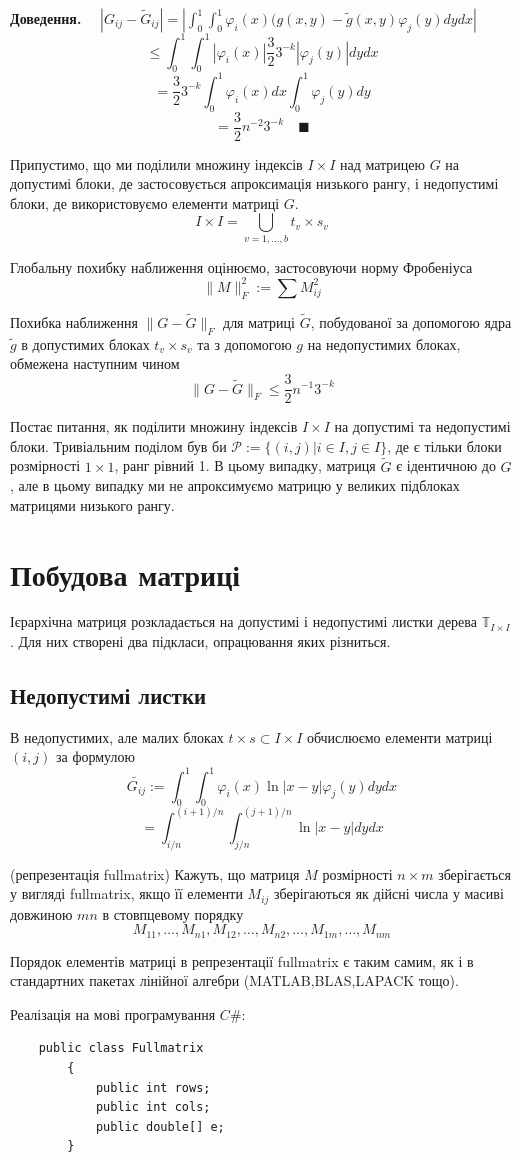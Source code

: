 \documentclass[12pt]{report}
\begin{document}
	{\bf Доведення.} $\quad|G_{ij}-\tilde{G}_{ij}|=|\int_{0}^{1}\int_{0}^{1}\varphi_i(x)(g(x,y)-\tilde{g}(x,y)\varphi_j(y)dydx|$
	$$\le \int_{0}^{1}\int_{0}^{1}|\varphi_i(x)|\frac{3}{2}3^{-k}|\varphi_j(y)|dydx$$
	$$=\frac{3}{2}3^{-k}\int_{0}^{1}\varphi_i(x)dx\int_{0}^{1}\varphi_j(y)dy$$
	$$= \frac{3}{2}n^{-2}3^{-k} \quad\blacksquare$$ 
	\par Припустимо, що ми поділили множину індексів $I\times I$ над матрицею $G$ на допустимі блоки, де застосовується апроксимація низького рангу, і недопустимі блоки, де використовуємо елементи матриці $G$.
	$$I\times I=\bigcup_{v=1,\dots,b}t_v\times s_v$$
	\par Глобальну похибку наближення оцінюємо, застосовуючи норму Фробеніуса 
	$$\|M\|^2_F:=\sum M_{ij}^2$$
	\begin{Lem}
	Похибка наближення $\|G-\tilde{G}\|_F$ для матриці $\tilde{G}$, побудованої за допомогою ядра $\tilde{g}$ в допустимих блоках $t_v\times s_v$ та з допомогою $g$ на недопустимих блоках, обмежена наступним чином
	$$\|G-\tilde{G}\|_F\le \frac{3}{2}n^{-1}3^{-k}$$
	\end{Lem}
	\par Постає питання, як поділити множину індексів $I\times I$ на допустимі та недопустимі блоки. Тривіальним поділом був би $\mathcal{P}:=\{(i,j)|i\in I,j\in I\}$, де є тільки блоки розмірності $1\times 1$, ранг рівний 1. В цьому випадку, матриця $\tilde{G}$ є ідентичною до $G$, але в цьому випадку ми не апроксимуємо матрицю у великих підблоках матрицями низького рангу. 
	\section{Побудова матриці}
	\hspace{0.8cm} Ієрархічна матриця розкладається на допустимі і недопустимі листки дерева $\mathbb{T}_{I\times I}$. Для них створені два підкласи, опрацювання яких різниться.
	\subsection{Недопустимі листки}
	\hspace{0.8cm} В недопустимих, але малих блоках $t\times s\subset I\times I$ обчислюємо елементи матриці $(i,j)$ за формулою
	$$\tilde{G_{ij}}:=\int_{0}^{1}\int_{0}^{1}\varphi_i(x)\ln|x-y|\varphi_j(y)dydx$$$$=\int_{i/n}^{(i+1)/n}\int_{j/n}^{(j+1)/n}\ln|x-y|dydx$$
	\begin{Def}
		(репрезентація fullmatrix) Кажуть, що матриця $M$ розмірності $n\times m$ зберігається у вигляді fullmatrix, якщо її елементи $M_{ij}$ зберігаються як дійсні числа у масиві довжиною $mn$ в стовпцевому порядку
		$$M_{11},\dots,M_{n1},M_{12},\dots,M_{n2},\dots,M_{1m},\dots,M_{nm}$$
	\end{Def}
	\par Порядок елементів матриці в репрезентації fullmatrix є таким самим, як і в стандартних пакетах лінійної алгебри (MATLAB,BLAS,LAPACK тощо).
	\par Реалізація на мові програмування $C\#$:
	\begin{verbatim}
	public class Fullmatrix
	    {
	        public int rows;
	        public int cols;
	        public double[] e;
	    }
	\end{verbatim}
\end{document}

